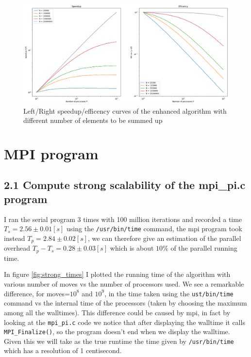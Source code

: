 \documentclass[a4paper]{article}
\begin{document}
\begin{figure}[h]
    \centering
    \includegraphics[scale=0.4]{Speedup_sum_enhanced.png}
    \caption{Left/Right speedup/efficency curves of the enhanced algorithm with different number of elements to be summed up}
    \label{fig:speedup_enhanced}
\end{figure}


\section{MPI program}
\subsection*{2.1 Compute strong scalability of the mpi\_pi.c program}
I ran the serial program 3 times with 100 million iterations and recorded a time $T_s=2.56\pm0.01 [s]$ using the \texttt{/usr/bin/time} command, the mpi program took instead $T_{p}=2.84\pm0.02 [s]$, we can therefore give an estimation of the parallel overhead $T_{p} - T_s = 0.28 \pm 0.03 [s]$ which is about $10\%$ of the parallel running time.

In figure \ref{fig:strong_times} I plotted the running time of the algorithm with various number of moves vs the number of processors used. We see a remarkable difference, for moves=$10^8$ and $10^9$, in the time taken using the \texttt{ust/bin/time} command vs the internal time of the processors (taken by choosing the maximum among all the walltimes). This difference could be caused by mpi, in fact by looking at the \texttt{mpi\_pi.c} code we notice that after displaying the walltime it calls \texttt{MPI\_Finalize()}, so the program doesn't end when we display the walltime. Given this we will take as the true runtime the time given by \texttt{/usr/bin/time} which has a resolution of 1 centisecond.
\end{document}
